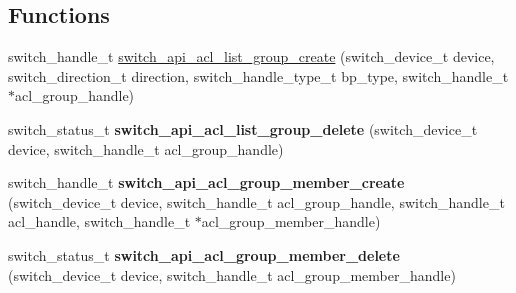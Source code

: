 \subsection*{Functions}
\begin{DoxyCompactItemize}
\item 
switch\+\_\+handle\+\_\+t \hyperlink{group__ACL_gabf7e6b5a9a2b7e4388b296928f8db8c3}{switch\+\_\+api\+\_\+acl\+\_\+list\+\_\+group\+\_\+create} (switch\+\_\+device\+\_\+t device, switch\+\_\+direction\+\_\+t direction, switch\+\_\+handle\+\_\+type\+\_\+t bp\+\_\+type, switch\+\_\+handle\+\_\+t $\ast$acl\+\_\+group\+\_\+handle)
\item 
\hypertarget{group__ACL_gade3713baf65a50910a2df8806c77056a}{switch\+\_\+status\+\_\+t {\bfseries switch\+\_\+api\+\_\+acl\+\_\+list\+\_\+group\+\_\+delete} (switch\+\_\+device\+\_\+t device, switch\+\_\+handle\+\_\+t acl\+\_\+group\+\_\+handle)}\label{group__ACL_gade3713baf65a50910a2df8806c77056a}

\item 
\hypertarget{group__ACL_gae40d74c9fa5f73de8fd64740613ad275}{switch\+\_\+handle\+\_\+t {\bfseries switch\+\_\+api\+\_\+acl\+\_\+group\+\_\+member\+\_\+create} (switch\+\_\+device\+\_\+t device, switch\+\_\+handle\+\_\+t acl\+\_\+group\+\_\+handle, switch\+\_\+handle\+\_\+t acl\+\_\+handle, switch\+\_\+handle\+\_\+t $\ast$acl\+\_\+group\+\_\+member\+\_\+handle)}\label{group__ACL_gae40d74c9fa5f73de8fd64740613ad275}

\item 
\hypertarget{group__ACL_ga90153860bea514695215e90423736310}{switch\+\_\+status\+\_\+t {\bfseries switch\+\_\+api\+\_\+acl\+\_\+group\+\_\+member\+\_\+delete} (switch\+\_\+device\+\_\+t device, switch\+\_\+handle\+\_\+t acl\+\_\+group\+\_\+member\+\_\+handle)}\label{group__ACL_ga90153860bea514695215e90423736310}


\end{DoxyCompactItemize}
